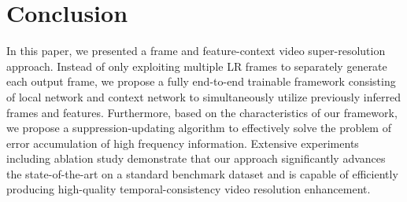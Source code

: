 \documentclass[letterpaper]{article} %
\begin{document}
\section{Conclusion}


In this paper, we presented a frame and feature-context video super-resolution approach. Instead of only exploiting multiple LR frames to separately generate each output frame, we propose a fully end-to-end trainable framework consisting of local network and context network to simultaneously utilize previously inferred frames and features. Furthermore, based on the characteristics of our framework, we propose a suppression-updating algorithm to effectively solve the problem of error accumulation of high frequency information. Extensive experiments including ablation study demonstrate that our approach significantly advances the state-of-the-art on a standard benchmark dataset and is capable of efficiently producing high-quality temporal-consistency video resolution enhancement.



\end{document}
